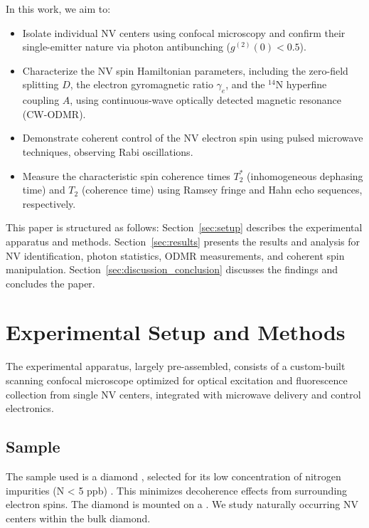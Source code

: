 \documentclass[aps,prb,twocolumn,superscriptaddress,floatfix,longbibliography,citeautoscript]{revtex4-2}
\begin{document}
In this work, we aim to:
\begin{itemize}
    \item Isolate individual NV centers using confocal microscopy and confirm their single-emitter nature via photon antibunching ($g^{(2)}(0) < 0.5$).
    \item Characterize the NV spin Hamiltonian parameters, including the zero-field splitting $D$, the electron gyromagnetic ratio $\gamma_e$, and the $^{14}$N hyperfine coupling $A$, using continuous-wave optically detected magnetic resonance (CW-ODMR).
    \item Demonstrate coherent control of the NV electron spin using pulsed microwave techniques, observing Rabi oscillations.
    \item Measure the characteristic spin coherence times $T_2^*$ (inhomogeneous dephasing time) and $T_2$ (coherence time) using Ramsey fringe and Hahn echo sequences, respectively.
\end{itemize}

This paper is structured as follows: Section~\ref{sec:setup} describes the experimental apparatus and methods. Section~\ref{sec:results} presents the results and analysis for NV identification, photon statistics, ODMR measurements, and coherent spin manipulation. Section~\ref{sec:discussion_conclusion} discusses the findings and concludes the paper.

\section{\label{sec:setup}Experimental Setup and Methods}

The experimental apparatus, largely pre-assembled, consists of a custom-built scanning confocal microscope optimized for optical excitation and fluorescence collection from single NV centers, integrated with microwave delivery and control electronics. 

\subsection{\label{sec:sample}Sample}
The sample used is a  diamond 
, selected for its low concentration of nitrogen impurities (N < 5 ppb) . This minimizes decoherence effects from surrounding electron spins. The diamond is mounted on a . We study naturally occurring NV centers within the bulk diamond. 
\end{document}
